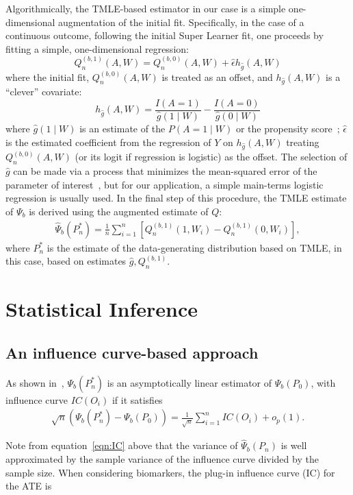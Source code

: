 Algorithmically, the TMLE-based estimator in our case is a simple
one-dimensional augmentation of the initial fit. Specifically, in the case of
a continuous outcome, following the initial Super Learner fit, one proceeds by
fitting a simple, one-dimensional regression:
$$
Q^{(b, 1)}_n(A, W) = Q^{(b, 0)}_n(A, W) + \hat{\epsilon} h_{\hat{g}}(A, W)
$$
where the initial fit, $Q^{(b, 0)}_n(A, W)$ is treated as an offset, and
$h_{\hat{g}}(A, W)$ is a ``clever'' covariate:
$$
h_{\hat{g}}(A, W) = \frac{I(A = 1)}{\hat{g}(1 \mid W)} - \frac{I(A = 0)}{\hat{g}(0 \mid W)}
$$
where $\hat{g}(1 \mid W)$ is an estimate of the $P(A = 1 \mid W)$ or the
propensity score~\cite{rosenbaum1983central}; $\hat{\epsilon}$ is the estimated
coefficient from the regression of $Y$ on $h_{\hat{g}}(A, W)$ treating
$Q^{(b, 0)}_n(A, W)$ (or its logit if regression is logistic) as the offset.
The selection of $\hat{g}$ can be made via a process that minimizes the
mean-squared error of the parameter of interest~\cite{gruber2010application},
but for our application, a simple main-terms logistic regression is usually
used. In the final step of this procedure, the TMLE estimate of $\Psi_b$ is
derived using the augmented estimate of $Q$:
\begin{eqnarray}
\hat{\Psi}_b(P^*_n) = \frac{1}{n}\sum^{n}_{i = 1}[Q^{(b, 1)}_n(1, W_i) - Q^{(b, 1)}_{n}(0, W_i)],
\end{eqnarray}
where $P^*_n$ is the estimate of the data-generating distribution based on TMLE,
in this case, based on estimates $\hat{g},Q^{(b,1)}_n$.

\section{Statistical Inference}\label{inference}

\subsection{An influence curve-based approach}\label{ic}

As shown in~\cite{van2011targeted}, $\Psi_b(P^*_n)$ is an asymptotically
linear estimator of $\Psi_b(P_0)$, with influence curve $IC(O_i)$ if it
satisfies
\begin{eqnarray}
\sqrt{n}(\Psi_b(P^*_n) - \Psi_b(P_0)) = \frac{1}{\sqrt{n}}\sum^{n}_{i = 1}IC(O_i) + o_p(1).
\label{eqn:IC}
\end{eqnarray}

Note from equation~\ref{eqn:IC} above that the variance of $\hat{\Psi}_b(P_n)$
is well approximated by the sample variance of the influence curve divided by
the sample size. When considering biomarkers, the plug-in influence curve (IC)
for the ATE is

